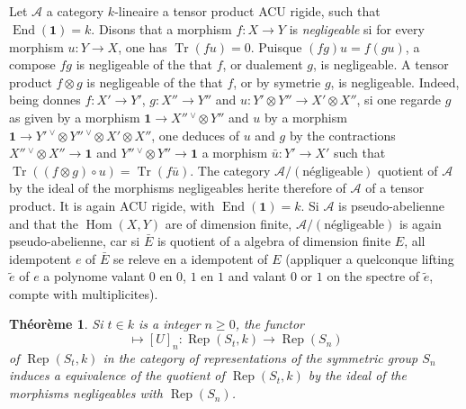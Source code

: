 \documentclass[11pt,a4paper]{article}
\theoremstyle{plain}
\newtheorem{theorem}{Th\'eor\`eme}[section]
\theoremstyle{definition}
\DeclareMathOperator{\Hom}{Hom}
\DeclareMathOperator{\End}{End}
\DeclareMathOperator{\Tr}{Tr}
\DeclareMathOperator{\Rep}{Rep}
\begin{document}
\subsection{}
Let $\mathcal{A}$ a category $k$-lineaire a tensor product ACU rigide, such that $\End(\mathbf{1}) = k$. Disons that a morphism $f : X \to Y$ is \emph{negligeable} si for every morphism $u : Y \to X$, one has $\Tr(fu) = 0$. Puisque $(fg)u = f(gu)$, a compose $fg$ is negligeable of the that $f$, or dualement $g$, is negligeable. A tensor product $f \otimes g$ is negligeable of the that $f$, or by symetrie $g$, is negligeable. Indeed, being donnes $f : X' \to Y'$, $g : X'' \to Y''$ and $u : Y' \otimes Y'' \to X' \otimes X''$, si one regarde $g$ as given by a morphism $\mathbf{1} \to X''\!\,^\vee \otimes Y''$ and $u$ by a morphism $\mathbf{1} \to Y'\!\,^\vee \otimes Y''\!\,^\vee \otimes X' \otimes X''$, one deduces of $u$ and $g$ by the contractions $X''\!\,^\vee \otimes X'' \to \mathbf{1}$ and $Y''\!\,^\vee \otimes Y'' \to \mathbf{1}$ a morphism $\bar{u} : Y' \to X'$ such that $\Tr((f \otimes g) \circ u) = \Tr(f\bar{u})$. The category $\mathcal{A}/(\text{n\'egligeable})$ quotient of $\mathcal{A}$ by the ideal of the morphisms negligeables herite therefore of $\mathcal{A}$ of a tensor product. It is again ACU rigide, with $\End(\mathbf{1}) = k$. Si $\mathcal{A}$ is pseudo-abelienne and that the $\Hom(X, Y)$ are of dimension finite, $\mathcal{A}/(\text{n\'egligeable})$ is again pseudo-abelienne, car si $\bar{E}$ is quotient of a algebra of dimension finite $E$, all idempotent $e$ of $\bar{E}$ se releve en a idempotent of $E$ (appliquer a quelconque lifting $\tilde{e}$ of $e$ a polynome valant $0$ en $0$, $1$ en $1$ and valant $0$ or $1$ on the spectre of $\tilde{e}$, compte with multiplicites).

\begin{theorem}
Si $t \in k$ is a integer $n \geq 0$, the functor
\begin{equation}
[U] \mapsto [U]_n : \Rep(S_t, k) \to \Rep(S_n) \tag{6.2.1}
\end{equation}
of $\Rep(S_t, k)$ in the category of representations of the symmetric group $S_n$ induces a equivalence of the quotient of $\Rep(S_t, k)$ by the ideal of the morphisms negligeables with $\Rep(S_n)$.
\end{theorem}
\end{document}
